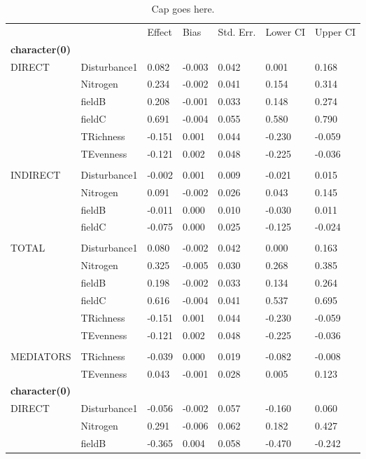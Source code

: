 \begin{longtable}[c]{l l l l l l l }
\caption{Cap goes here. \label{tbl:table-name}}\\
 & & Effect & Bias & Std.  Err. & Lower  CI & Upper  CI\\
\textbf{character(0)} &  &  &  &  &  &\\
\hline
 DIRECT & Disturbance1 & 0.082 & -0.003 & 0.042 & 0.001 & 0.168\\
 & Nitrogen & 0.234 & -0.002 & 0.041 & 0.154 & 0.314\\
 & fieldB & 0.208 & -0.001 & 0.033 & 0.148 & 0.274\\
 & fieldC & 0.691 & -0.004 & 0.055 & 0.580 & 0.790\\
 & TRichness & -0.151 & 0.001 & 0.044 & -0.230 & -0.059\\
 & TEvenness & -0.121 & 0.002 & 0.048 & -0.225 & -0.036\\
 & & & & & & \\
 INDIRECT & Disturbance1 & -0.002 & 0.001 & 0.009 & -0.021 & 0.015\\
 & Nitrogen & 0.091 & -0.002 & 0.026 & 0.043 & 0.145\\
 & fieldB & -0.011 & 0.000 & 0.010 & -0.030 & 0.011\\
 & fieldC & -0.075 & 0.000 & 0.025 & -0.125 & -0.024\\
 & & & & & & \\
 TOTAL & Disturbance1 & 0.080 & -0.002 & 0.042 & 0.000 & 0.163\\
 & Nitrogen & 0.325 & -0.005 & 0.030 & 0.268 & 0.385\\
 & fieldB & 0.198 & -0.002 & 0.033 & 0.134 & 0.264\\
 & fieldC & 0.616 & -0.004 & 0.041 & 0.537 & 0.695\\
 & TRichness & -0.151 & 0.001 & 0.044 & -0.230 & -0.059\\
 & TEvenness & -0.121 & 0.002 & 0.048 & -0.225 & -0.036\\
 & & & & & & \\
 MEDIATORS &TRichness & -0.039 & 0.000 & 0.019 & -0.082 & -0.008\\
 & TEvenness & 0.043 & -0.001 & 0.028 & 0.005 & 0.123\\
\textbf{character(0)} &  &  &  &  &  &\\
\hline
 DIRECT & Disturbance1 & -0.056 & -0.002 & 0.057 & -0.160 & 0.060\\
 & Nitrogen & 0.291 & -0.006 & 0.062 & 0.182 & 0.427\\
 & fieldB & -0.365 & 0.004 & 0.058 & -0.470 & -0.242\\

\end{longtable}
